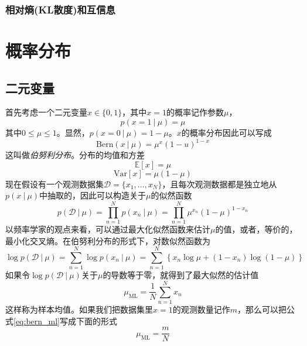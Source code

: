 \documentclass[11pt]{ctexbook}
\begin{document}
\subsection{相对熵(KL散度)和互信息}
\chapter{概率分布}
\section{二元变量}
首先考虑一个二元变量$x \in \{0, 1\}$，其中$x=1$的概率记作参数$\mu$，
\begin{equation}
	p(x=1\ |\ \mu) = \mu
\end{equation}
其中$0 \leq \mu \leq 1$。显然，$p(x=0\ |\ \mu) = 1-\mu$。$x$的概率分布因此可以写成
\begin{equation}
	\mathrm{Bern}(x \ |\ \mu) = \mu^x(1-u)^{1-x}
\end{equation}
这叫做\emph{伯努利分布}。分布的均值和方差
\begin{equation}
	\mathbb E[x] = \mu
\end{equation}
\begin{equation}
	\mathrm{Var}[x] = \mu(1-\mu)
\end{equation}
现在假设有一个观测数据集$\mathcal D = \{x_1, \ldots, x_N\}$，且每次观测数据都是独立地从$p(x\ |\ \mu)$中抽取的，因此可以构造关于$\mu$的似然函数
\begin{equation}
	\label{eq:bern-likehook}
	p(\mathcal D \ |\ \mu) = \prod_{n=1}^{N}p(x_n\ |\ \mu) = \prod_{n=1}^{N}\mu^{x_n}(1-\mu)^{1-x_n}
\end{equation}
以频率学家的观点来看，可以通过最大化似然函数来估计$\mu$的值，或者，等价的，最小化交叉熵。在伯努利分布的形式下，对数似然函数为
\begin{equation}
	\log p(\mathcal D \ |\ \mu) = \sum_{n=1}^{N}\log p(x_n\ |\ \mu) = \sum_{n=1}^{N}\left\{ x_n\log \mu + (1-x_n)\log(1-\mu) \right\}
\end{equation}
如果令$\log p(\mathcal{D}\ |\ \mu)$关于$\mu$的导数等于零，就得到了最大似然的估计值
\begin{equation}
	\label{eq:bern_ml}
	\mu_{\mathrm{ML}} = \frac{1}{N}\sum_{n=1}^{N}x_n
\end{equation}
这样称为样本均值。如果我们把数据集里$x=1$的观测数量记作$m$，那么可以把公式\ref{eq:bern_ml}写成下面的形式
\begin{equation}
	\mu_{\mathrm{ML}} = \frac{m}{N}
\end{equation}
\end{document}
